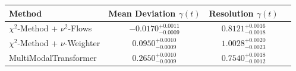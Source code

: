     \begin{tabular}{lccc}
        \toprule
        Method & Mean Deviation $\gamma(t)$ & Resolution $\gamma(t)$ \\
        \midrule
        $\chi^2$-Method + $\nu^2$-Flows & $-0.0170^{+0.0011}_{-0.0009}$ & $0.8121^{+0.0016}_{-0.0018}$ \\
        $\chi^2$-Method + $\nu$-Weighter & $0.0950^{+0.0010}_{-0.0009}$ & $1.0028^{+0.0020}_{-0.0023}$ \\
        MultiModalTransformer & $0.2650^{+0.0010}_{-0.0009}$ & $0.7540^{+0.0018}_{-0.0012}$ \\
        \bottomrule
    \end{tabular}